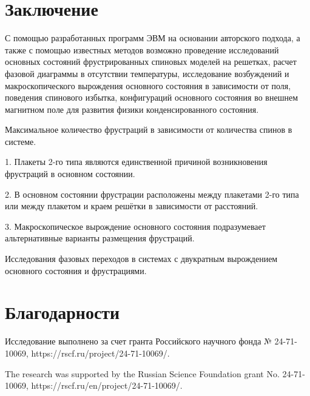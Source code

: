 \documentclass[utf8, babel, sor, jor, amsmath, amssymb, reprint]{elsarticle} %
\begin{document}
\section{Заключение}

С помощью разработанных программ ЭВМ на основании авторского подхода, а также с помощью известных методов возможно проведение исследований основных состояний фрустрированных спиновых моделей на решетках, расчет фазовой диаграммы в отсутствии температуры, исследование возбуждений и макроскопического вырождения основного состояния в зависимости от поля, поведения спинового избытка, конфигураций основного состояния во внешнем магнитном поле для развития физики конденсированного состояния.

Максимальное количество фрустраций в зависимости от количества спинов в системе.

1. Плакеты 2-го типа являются единственной причиной возникновения фрустраций в основном состоянии.

2. В основном состоянии фрустрации расположены между плакетами 2-го типа или между плакетом и краем решётки в зависимости от расстояний.

3. Макроскопическое вырождение основного состояния подразумевает альтернативные варианты размещения фрустраций.


Исследования фазовых переходов в системах с двукратным вырождением основного состояния и фрустрациями.

\section{Благодарности}

Исследование выполнено за счет гранта Российского научного фонда № 24-71-10069, https://rscf.ru/project/24-71-10069/.

The research was supported by the Russian Science Foundation grant No. 24-71-10069, https://rscf.ru/en/project/24-71-10069/.


\end{document}
